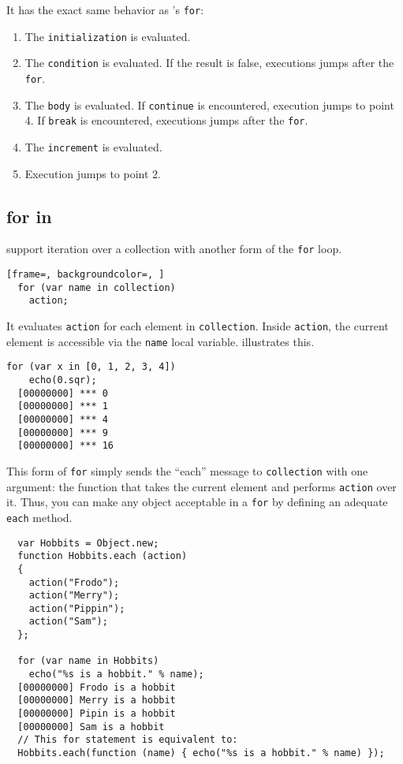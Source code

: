 \documentclass[openright,twoside,12pt]{report}
\begin{document}
It has the exact same behavior as \C's \lstinline|for|:

\begin{enumerate}
\item The \lstinline|initialization| is evaluated.
\item The \lstinline|condition| is evaluated. If the result is false,
  executions jumps after the \lstinline|for|.
\item The \lstinline|body| is evaluated. If \lstinline|continue| is
  encountered, execution jumps to point 4. If \lstinline|break| is
  encountered, executions jumps after the \lstinline|for|.
\item The \lstinline|increment| is evaluated.
\item Execution jumps to point 2.
\end{enumerate}

\subsection{for in}

\us support iteration over a collection with another form of the
\lstinline|for| loop.

\begin{lstlisting}[frame=, backgroundcolor=, ]
  for (var name in collection)
    action;
\end{lstlisting}

It evaluates \lstinline|action| for each element in
\lstinline|collection|. Inside \lstinline|action|, the current element
is accessible via the \lstinline|name| local variable. 
illustrates this.


\begin{lstlisting}[caption=Iterating over a collection with for, label=lst:foreach,
  float=\floatpos]
  for (var x in [0, 1, 2, 3, 4])
    echo(0.sqr);
  [00000000] *** 0
  [00000000] *** 1
  [00000000] *** 4
  [00000000] *** 9
  [00000000] *** 16
\end{lstlisting}

This form of \lstinline|for| simply sends the ``each'' message to
\lstinline|collection| with one argument: the function that takes the
current element and performs \lstinline|action| over it. Thus, you can
make any object acceptable in a \lstinline|for| by defining an
adequate \lstinline|each| method.

\begin{lstlisting}
  var Hobbits = Object.new;
  function Hobbits.each (action)
  {
    action("Frodo");
    action("Merry");
    action("Pippin");
    action("Sam");
  };

  for (var name in Hobbits)
    echo("%s is a hobbit." % name);
  [00000000] Frodo is a hobbit
  [00000000] Merry is a hobbit
  [00000000] Pipin is a hobbit
  [00000000] Sam is a hobbit
  // This for statement is equivalent to:
  Hobbits.each(function (name) { echo("%s is a hobbit." % name) });
\end{lstlisting}
\end{document}

